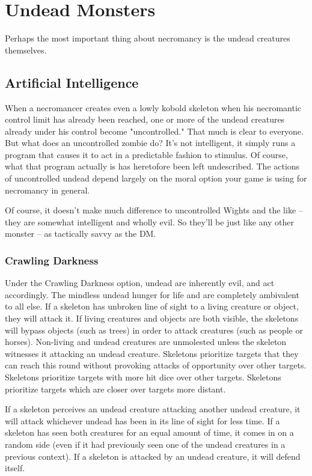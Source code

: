 \section{Undead Monsters}

Perhaps the most important thing about necromancy is the undead creatures themselves.

\subsection{Artificial Intelligence}

When a necromancer creates even a lowly kobold skeleton when his necromantic control limit has already been reached, one or more of the undead creatures already under his control become "uncontrolled." That much is clear to everyone. But what does an uncontrolled zombie do? It's not intelligent, it simply runs a program that causes it to act in a predictable fashion to stimulus. Of course, what that program actually is has heretofore been left undescribed. The actions of uncontrolled undead depend largely on the moral option your game is using for necromancy in general.

Of course, it doesn't make much difference to uncontrolled Wights and the like -- they are somewhat intelligent and wholly evil. So they'll be just like any other monster -- as tactically savvy as the DM.

\subsubsection{Crawling Darkness}

Under the Crawling Darkness option, undead are inherently evil, and act accordingly. The mindless undead hunger for life and are completely ambivalent to all else. If a skeleton has unbroken line of sight to a living creature or object, they will attack it. If living creatures and objects are both visible, the skeletons will bypass objects (such as trees) in order to attack creatures (such as people or horses). Non-living and undead creatures are unmolested unless the skeleton witnesses it attacking an undead creature. Skeletons prioritize targets that they can reach this round without provoking attacks of opportunity over other targets. Skeletons prioritize targets with more hit dice over other targets. Skeletons prioritize targets which are closer over targets more distant.

If a skeleton perceives an undead creature attacking another undead creature, it will attack whichever undead has been in its line of sight for less time. If a skeleton has seen both creatures for an equal amount of time, it comes in on a random side (even if it had previously seen one of the undead creatures in a previous context). If a skeleton is attacked by an undead creature, it will defend itself.

